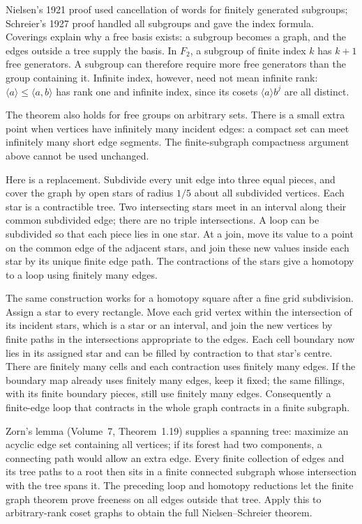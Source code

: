 \begin{beauty}
Nielsen's 1921 proof used cancellation of words for finitely generated subgroups; Schreier's 1927 proof handled all subgroups and gave the index formula. Coverings explain why a free basis exists: a subgroup becomes a graph, and the edges outside a tree supply the basis. In $F_2$, a subgroup of finite index $k$ has $k+1$ free generators. A subgroup can therefore require more free generators than the group containing it. Infinite index, however, need not mean infinite rank: $\langle a\rangle\le\langle a,b\rangle$ has rank one and infinite index, since its cosets $\langle a\rangle b^j$ are all distinct.
\end{beauty}

\begin{remark}
The theorem also holds for free groups on arbitrary sets. There is a small extra point when vertices have infinitely many incident edges: a compact set can meet infinitely many short edge segments. The finite-subgraph compactness argument above cannot be used unchanged.

Here is a replacement. Subdivide every unit edge into three equal pieces, and cover the graph by open stars of radius $1/5$ about all subdivided vertices. Each star is a contractible tree. Two intersecting stars meet in an interval along their common subdivided edge; there are no triple intersections. A loop can be subdivided so that each piece lies in one star. At a join, move its value to a point on the common edge of the adjacent stars, and join these new values inside each star by its unique finite edge path. The contractions of the stars give a homotopy to a loop using finitely many edges.

The same construction works for a homotopy square after a fine grid subdivision. Assign a star to every rectangle. Move each grid vertex within the intersection of its incident stars, which is a star or an interval, and join the new vertices by finite paths in the intersections appropriate to the edges. Each cell boundary now lies in its assigned star and can be filled by contraction to that star's centre. There are finitely many cells and each contraction uses finitely many edges. If the boundary map already uses finitely many edges, keep it fixed; the same fillings, with its finite boundary pieces, still use finitely many edges. Consequently a finite-edge loop that contracts in the whole graph contracts in a finite subgraph.

Zorn's lemma (Volume~7, Theorem~1.19) supplies a spanning tree: maximize an acyclic edge set containing all vertices; if its forest had two components, a connecting path would allow an extra edge. Every finite collection of edges and its tree paths to a root then sits in a finite connected subgraph whose intersection with the tree spans it. The preceding loop and homotopy reductions let the finite graph theorem prove freeness on all edges outside that tree. Apply this to arbitrary-rank coset graphs to obtain the full Nielsen--Schreier theorem.


\end{remark}

